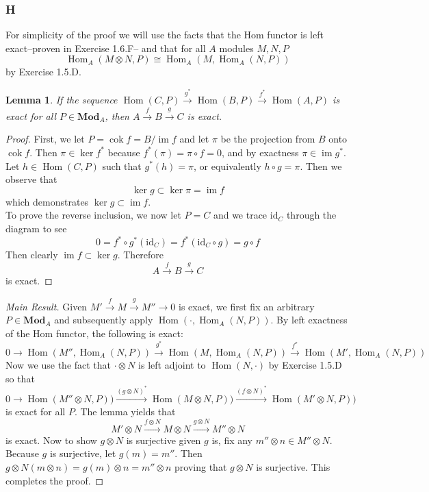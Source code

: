 \documentclass{article}
\newcommand{\id}{\mathrm{id}}
\newcommand{\Mod}{\mathbf{Mod}} %
\DeclareMathOperator{\im}{\mathrm{im}}
\DeclareMathOperator{\cok}{\mathrm{cok}}
\DeclareMathOperator{\Hom}{\mathrm{Hom}}
\newtheorem*{lemma*}{Lemma}
\begin{document}
\subsubsection{H}\label{1.3.H}
    For simplicity of the proof we will use the facts that the Hom functor is left exact--proven in Exercise 1.6.F-- and that for all $A$ modules $M,N,P$
    \[
    \Hom_A(M\otimes N,P)\cong \Hom_A(M,\Hom_A(N,P))
    \]
by Exercise 1.5.D. 
\begin{lemma*}
If the sequence $\Hom(C,P)\xrightarrow{g^*}\Hom(B,P)\xrightarrow{f^*}\Hom(A,P)$ is exact for all $P\in \Mod_A$, then $A\xrightarrow{f}B\xrightarrow{g}C$ is exact.
\cite{tensorRexact}
\end{lemma*}
\begin{proof}
    First, we let $P=\cok f=B/ \im f$ and let $\pi$ be the projection from $B$ onto $\cok f$. Then $\pi\in \ker f^*$ because $f^*(\pi)=\pi\circ f=0$, and by exactness $\pi\in \im g^*$. Let $h\in \Hom(C,P)$ such that $g^*(h)=\pi$, or equivalently $h\circ g=\pi$. Then we observe that
    \[
    \ker g\subset \ker \pi=\im f
    \]
    which demonstrates $\ker g\subset \im f$.\\
    To prove the reverse inclusion, we now let $P=C$ and we trace $\id_C$ through the diagram to see
    \[
    0=f^*\circ g^*(\id_C)=f^*(\id_C\circ g)=g\circ f
    \]
    Then clearly $\im f\subset \ker g$. Therefore
    \[
    A\xrightarrow{f}B\xrightarrow{g}C
    \]
    is exact.
\end{proof}
\begin{proof}[Main Result]
    Given $M'\xrightarrow{f} M\xrightarrow{g} M''\to 0$ is exact, we first fix an arbitrary $P\in \Mod_A$ and subsequently apply $\Hom(\cdot,\Hom_A(N,P))$. By left exactness of the Hom functor, the following is exact:
    \[
    0\to \Hom(M'',\Hom_A(N,P))\xrightarrow{g^*} \Hom(M,\Hom_A(N,P))\xrightarrow{f^*} \Hom(M',\Hom_A(N,P))
    \]
    Now we use the fact that $\cdot \otimes N$ is left adjoint to $\Hom(N,\cdot)$ by Exercise 1.5.D so that
    \[
    0\to \Hom(M''\otimes N,P))\xrightarrow{(g\otimes N)^*} \Hom(M\otimes N,P))\xrightarrow{(f\otimes N)^*} \Hom(M'\otimes N,P))
    \]
    is exact for all $P$. The lemma yields that
    \[
    M'\otimes N\xrightarrow{f\otimes N} M\otimes N\xrightarrow{g\otimes N}M''\otimes N
    \]
    is exact. Now to show $g\otimes N$ is surjective given $g$ is, fix any $m''\otimes n\in M''\otimes N$. Because $g$ is surjective, let $g(m)=m''$. Then $g\otimes N(m\otimes n)=g(m)\otimes n=m''\otimes n$ proving that $g\otimes N$ is surjective. This completes the proof.
\end{proof}
\end{document}
